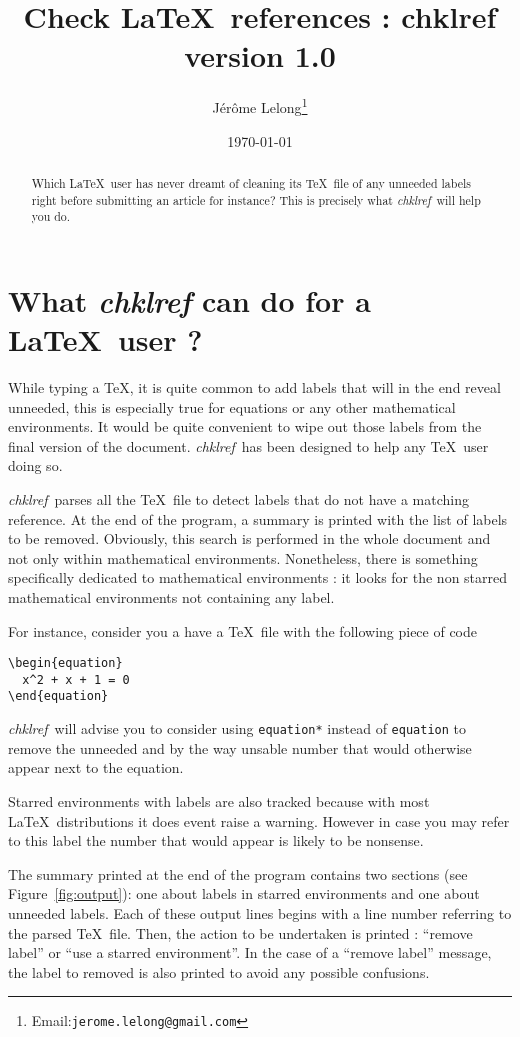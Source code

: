 \documentclass[a4paper,11pt,twoside]{article}
\title{Check \LaTeX\ references : chklref\\
{\large version 1.0}}
\date{\today}
\author{J\'er\^ome Lelong\footnote{Email:\texttt{jerome.lelong@gmail.com}}}
\def\chk{{\it chklref}}
\begin{document}
\maketitle

\begin{abstract} Which \LaTeX\ user has never dreamt of cleaning its \TeX\ file
  of any unneeded labels right before submitting an article for instance? This
  is precisely what \chk\ will help you do.
\end{abstract}

\section{What {\it chklref} can do for a \LaTeX\ user ?}

While typing a \TeX, it is quite common to add labels that will in the end
reveal unneeded, this is especially true for equations or any other mathematical
environments. It would be quite convenient to wipe out those labels from the
final version of the document. \chk\ has been designed to help any \TeX\
user doing so.

\chk\ parses all the \TeX\ file to detect labels that do not have a matching
reference. At the end of the program, a summary is printed with the list of
labels to be removed. Obviously, this search is performed in the whole document
and not only within mathematical environments. Nonetheless, there is something
specifically dedicated to mathematical environments : it looks for the non
starred mathematical environments not containing any label.

For instance, consider you a have a \TeX\ file with the following piece of code
\begin{verbatim}
\begin{equation}
  x^2 + x + 1 = 0
\end{equation}
\end{verbatim}
\chk\ will advise you to consider using \verb!equation*! instead of
\verb!equation! to remove the unneeded and by the way unsable number that would
otherwise appear next to the equation.

Starred environments with labels are also tracked because with most \LaTeX\
distributions it does event raise a warning. However in case you may refer to
this label the number that would appear is likely to be nonsense.

The summary printed at the end of the program contains two sections (see
Figure~\ref{fig:output}): one about labels in starred environments and one about
unneeded labels. Each of these output lines begins with a line number referring
to the parsed \TeX\ file. Then, the action to be undertaken is printed :
``remove label'' or ``use a starred environment''. In the case of a ``remove
label'' message, the label to removed is also printed to avoid any possible
confusions.
\end{document}
